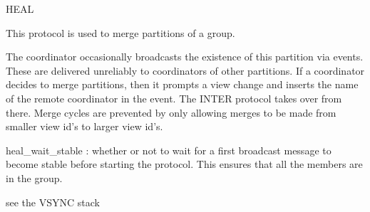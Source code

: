 \begin{Layer}{HEAL}

This protocol is used to merge partitions of a group.

\begin{Protocol}
The coordinator occasionally broadcasts the existence of this partition via
 events.  These are delivered unreliably to coordinators of other
partitions.  If a coordinator decides to merge partitions, then it prompts a
view change and inserts the name of the remote coordinator in the 
event.  The INTER protocol takes over from there.  Merge cycles are prevented
by only allowing merges to be made from smaller view id's to larger view id's.
\end{Protocol}

\begin{Parameters}
\item
heal\_wait\_stable : whether or not to wait for a first broadcast message to
become stable before starting the protocol.  This ensures that all the members
are in the group.
\end{Parameters}

\begin{Properties}
\item \todo{}
\end{Properties}

\begin{Sources}
\end{Sources}

\begin{GenEvent}
\end{GenEvent}

\begin{Testing}
\item see the VSYNC stack
\end{Testing}
\end{Layer}
